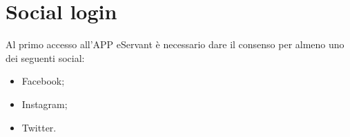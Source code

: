 \paragraph{}
\paragraph{}
\paragraph{}
\paragraph{}
\paragraph{}
\paragraph{}
\paragraph{}
\paragraph{}
\paragraph{}
\paragraph{}
\paragraph{}
\paragraph{}

\section{Social login}
Al primo accesso all'APP eServant è necessario dare il consenso per almeno uno dei seguenti social:
\begin{itemize}
\item Facebook;
\item Instagram;
\item Twitter.
\end{itemize}

